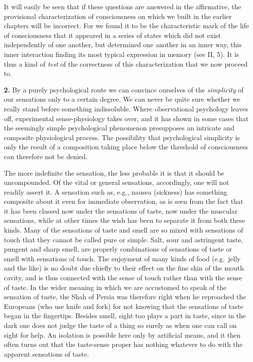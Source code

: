 \documentclass[12pt,a4paper]{book}
\newcommand{\opage}[1]{\marginnote{\footnotesize\textit{[#1]}}}
\begin{document}
It will easily be seen that if these questions are answered in the
affirmative, the provisional characterization of consciousness on which
we built in the earlier chapters will be incorrect. For we found it to
be the characteristic mark of the life of consciousness that it appeared
in a series of states which did not exist independently of one another,
but determined one another in an inner way, this inner interaction
finding its most typical expression in memory (see II, 5). It is thus a
kind of \emph{test} of the correctness of this characterization that we
now proceed to.

\textbf{2.} By a purely psychological route we can convince ourselves
of the \emph{simplicity} of our sensations only to a certain degree. We
can never be quite sure whether we really stand before something
indissoluble. Where observational psychology leaves off, experimental
sense-physiology takes over, and it has shown in some cases that the
seemingly simple psychological phenomenon presupposes an intricate and
composite physiological process. The possibility that psychological
simplicity is only the result of a composition taking place below the
threshold of consciousness can therefore not be denied.

The more indefinite the sensation, the less probable it is that it
should be uncompounded. Of the vital or general sensations, accordingly,
one will not readily assert it. A sensation such as, e.g., nausea
(sickness) has something composite about it even for immediate
observation,
\opage{122}as is seen from the fact that it has been classed now under
the sensations of taste, now under the muscular sensations, while at
other times the wish has been to separate it from both these kinds. Many
of the sensations of taste and smell are so mixed with sensations of
touch that they cannot be called pure or simple. Salt, sour and
astringent taste, pungent and sharp smell, are properly combinations of
sensations of taste or smell with sensations of touch. The enjoyment of
many kinds of food (e.g.\ jelly and the like) is no doubt due chiefly to
their effect on the fine skin of the mouth cavity, and is thus connected
with the sense of touch rather than with the sense of taste. In the wider
meaning in which we are accustomed to speak of the sensation of taste,
the Shah of Persia was therefore right when he reproached the Europeans
(who use knife and fork) for not knowing that the sensations of taste
began in the fingertips. Besides smell, sight too plays a part in taste,
since in the dark one does not judge the taste of a thing so surely as
when one can call on sight for help. An isolation is possible here only
by artificial means, and it then often turns out that the taste-sense
proper has nothing whatever to do with the apparent sensations of taste.
\end{document}
